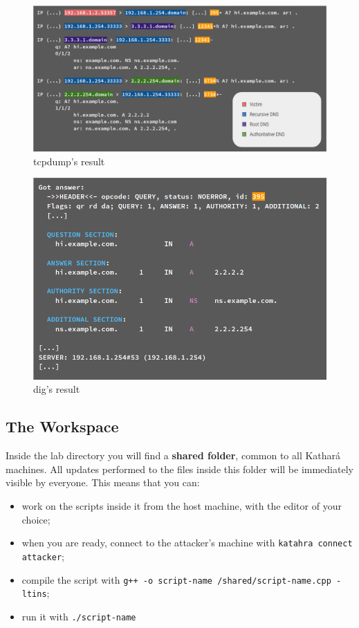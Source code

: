 \documentclass[11pt,a4paper]{article}
\begin{document}
\begin{figure}[h]
    \centering
    \includegraphics[width=\textwidth]{tcpdump-res.png}
    \caption{tcpdump's result}
    \label{fig:tcpdump-res}
\end{figure}

\begin{figure}[h]
    \centering
    \includegraphics[width=\textwidth]{dig-result.png}
    \caption{dig's result}
    \label{fig:dig-res}
\end{figure}

\subsection{The Workspace}

Inside the lab directory you will find a \textbf{shared folder}, common to all Kathará machines. All updates performed to the files inside this folder will be immediately visible by everyone. This means that you can:
\begin{itemize}
    \item work on the scripts inside it from the host machine, with the editor of your choice;
    \item when you are ready, connect to the attacker's machine with \texttt{katahra connect attacker};
    \item compile the script with \texttt{g++ -o script-name /shared/script-name.cpp -ltins};
    \item run it with \texttt{./script-name}
\end{itemize}
\end{document}
